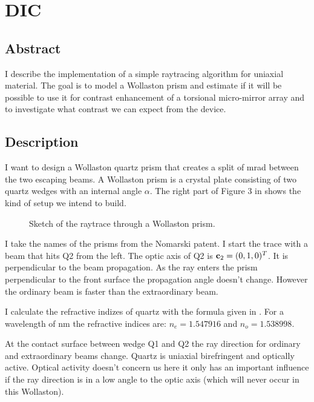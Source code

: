 \chapter{DIC}
\lstset{language=Maxima}

\section{Abstract}
I describe the implementation of a simple raytracing algorithm for
uniaxial material.  The goal is to model a Wollaston prism and
estimate if it will be possible to use it for contrast enhancement of
a torsional micro-mirror array and to investigate what contrast we can
expect from the device.
\section{Description}
I want to design a Wollaston quartz prism that creates a split of
\unit[32]{mrad} between the two escaping beams.  A Wollaston prism is
a crystal plate consisting of two quartz wedges with an internal angle
$\alpha$. The right part of Figure 3 in \citep{Nomarski1960} shows the kind
of setup we intend to build. 
\begin{figure}[htbp]
  \centering
  
  \caption{Sketch of the raytrace through a Wollaston prism.}
\end{figure}
I take the names of the prisms from the Nomarski patent. I start the
trace with a beam that hits Q2 from the left. The optic axis of Q2 is
$\mathbf{c}_2=(0,1,0)^T$. It is perpendicular to the beam propagation. As
the ray enters the prism perpendicular to the front surface the
propagation angle doesn't change. However the ordinary beam is faster
than the extraordinary beam.

I calculate the refractive indizes of quartz with the formula given in
\citep{Ghosh1999}. For a wavelength of \unit[768]{nm} the refractive indices
are: $n_e=1.547916$ and $n_o=1.538998$.

At the contact surface between wedge Q1 and Q2 the ray direction for
ordinary and extraordinary beams change. Quartz is uniaxial
birefringent and optically active. Optical activity doesn't concern us
here it only has an important influence if the ray direction is in a
low angle to the optic axis (which will never occur in this Wollaston).

